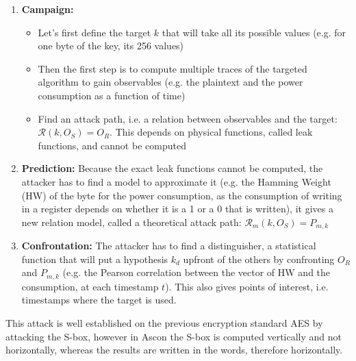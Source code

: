 \documentclass[a4paper,11pt,twocolumn]{article}
\begin{document}
	\begin{enumerate}
		\item \textbf{Campaign:}
		\begin{itemize}
			\item Let's first define the target $k$ that will take all its possible values (e.g. for one byte of the key, its 256 values)
			\item Then the first step is to compute multiple traces of the targeted algorithm to gain observables (e.g. the plaintext and the power consumption as a function of time)
			\item Find an attack path, i.e. a relation between observables and the target: $\mathcal{R}(k,O_S) = O_R$. This depends on physical functions, called leak functions, and cannot be computed
		\end{itemize}
		\item \textbf{Prediction:} Because the exact leak functions cannot be computed, the attacker has to find a model to approximate it (e.g. the Hamming Weight (HW) of the byte for the power consumption, as the consumption of writing in a register depends on whether it is a 1 or a 0 that is written), it gives a new relation model, called a theoretical attack path: $\mathcal{R}_m(k,O_S) = P_{m,k}$
		\item \textbf{Confrontation:} The attacker has to find a distinguisher, a statistical function that will put a hypothesis $k_d$ upfront of the others by confronting $O_R$ and $P_{m,k}$ (e.g. the Pearson correlation between the vector of HW and the consumption, at each timestamp $t$). This also gives points of interest, i.e. timestamps where the target is used.
	\end{enumerate}
	
	This attack is well established on the previous encryption standard AES \cite{aes,cpa_aes} by attacking the S-box, however in Ascon the S-box is computed vertically and not horizontally, whereas the results are written in the words, therefore horizontally.
	
\end{document}
